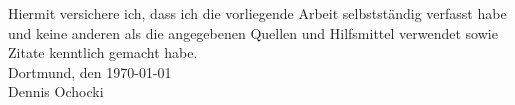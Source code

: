 \cleardoublepage
\normalsize
Hiermit versichere ich, dass ich die vorliegende Arbeit selbstständig verfasst habe und keine anderen als die angegebenen Quellen und Hilfsmittel verwendet sowie Zitate kenntlich gemacht habe.\\
\medskip
Dortmund, den \today\\
\bigskip
Dennis Ochocki
